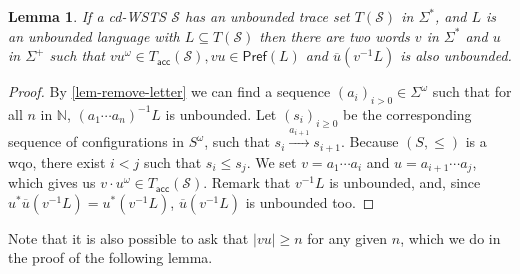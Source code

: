 \documentclass[11pt,reqno,a4paper]{amsart}
\newcommand{\ru}[1]{\xrightarrow{#1}}
\newcommand{\remove}[1]{\overline{#1}}
\newcommand{\prefix}[1]{\mathsf{Pref}(#1)}
\newcommand{\nat}{\mathbb{N}}
\theoremstyle{plain}
\newtheorem{lemma}[theorem]{Lemma}
\theoremstyle{definition}
\theoremstyle{remark}
\begin{document}
\begin{lemma}\label{lem-remove-star}
  If a cd-WSTS $\mathcal{S}$ has an unbounded trace set
  $T(\mathcal{S})$ in $\Sigma^\ast$, and $L$ is an unbounded language
  with $L\subseteq T(\mathcal{S})$ then there are two words $v$ in
  $\Sigma^\ast$ and $u$ in $\Sigma^+$ such that $vu^\omega \in
  T_\mathsf{acc}(\mathcal{S}), vu \in \prefix{L}$ and
  $\remove{u}(v^{-1}L)$ is also unbounded.
\end{lemma}
\begin{proof}
  By \autoref{lem-remove-letter} we can find a sequence
  $(a_i)_{i>0} \in \Sigma^\omega$ such that for all $n$ in $\nat$,
  $(a_1\cdots a_n)^{-1} L$ is unbounded.  Let $(s_i)_{i\geq 0}$ be the
  corresponding sequence of configurations in $S^\omega$, such that
  $s_i\ru{a_{i+1}}s_{i+1}$.  Because $(S,\leq)$ is a wqo, there exist $i<j$
  such that $s_i \leq s_j$.  We set $v = a_1\cdots a_i$ and $u =
  a_{i+1}\cdots a_j$, which gives us $v\cdot u^\omega \in
  T_\mathsf{acc}(\mathcal{S})$.  Remark that $v^{-1}L$ is unbounded,
  and, since $u^*\remove{u}(v^{-1}L) = u^*(v^{-1}L)$,
  $\remove{u}(v^{-1}L)$ is unbounded too.
\end{proof}

Note that it is also possible to ask that $|vu| \geq n$ for any given
$n$, which we do in the proof of the following lemma.
\end{document}
